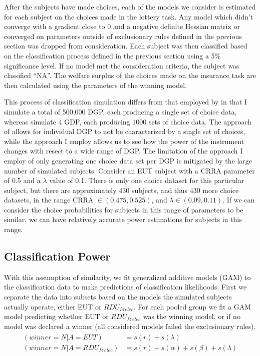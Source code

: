 \documentclass[../main.tex]{subfiles}
\begin{document}
After the subjects have made choices, each of the models we consider is estimated for each subject on the choices made in the lottery task.
Any model which didn't converge with a gradient close to 0 and a negative definite Hessian matrix or converged on parameters outside of exclusionary rules defined in the previous section was dropped from consideration.
Each subject was then classified based on the classification process defined in the previous section using a 5\% significance level.
If no model met the consideration criteria, the subject was classified \enquote{NA}.
The welfare surplus of the choices made on the insurance task are then calculated using the parameters of the winning model.

This process of classification simulation differs from that employed by \textcite{Wilcox2015} in that I simulate a total of 500,000 DGP, each producing a single set of choice data, whereas \textcite{Wilcox2015} simulate 4 GDP, each producing 1000 sets of choice data.
The approach of \textcite{Wilcox2015} allows for individual DGP to not be characterized by a single set of choices, while the approach I employ allows us to see how the power of the instrument changes with resect to a wide range of DGP.
The limitation of the approach I employ of only generating one choice data set per DGP is mitigated by the large number of simulated subjects.
Consider an EUT subject with a CRRA parameter of 0.5 and a $\lambda$ value of 0.1.
There is only one choice dataset for this particular subject, but there are approximately 430 subjects, and thus 430 more choice datasets, in the range CRRA $\in (0.475,0.525)$, and $\lambda \in (0.09, 0.11)$.
If we can consider the choice probabilities for subjects in this range of parameters to be similar, we can have relatively accurate power estimations for subjects in this range.

\subsection{\texorpdfstring{\textcite{Harrison2016}}{Harrison and Ng (2016)} Classification Power}

With this assumption of similarity, we fit generalized additive models (GAM) \parencite{Hastie1986} to the classification data to make predictions of classification likelihoods.
First we separate the data into subsets based on the models the simulated subjects actually operate, either EUT or $\mathit{RDU_{Prelec}}$.
For each pooled group we fit a GAM model predicting whether EUT or $\mathit{RDU_{Prelec}}$ was the winning model, or if no model was declared a winner (all considered models failed the exclusionary rules).
\begin{align}
	\label{eq4:GAM}
	\begin{split}
		(winner = N | A = EUT)                   &= s(r) + s(\lambda)\\
		(winner = N | A = \mathit{RDU_{Prelec}}) &= s(r) + s(\alpha) + s(\beta) + s(\lambda)
	\end{split}
\end{align}
\end{document}
